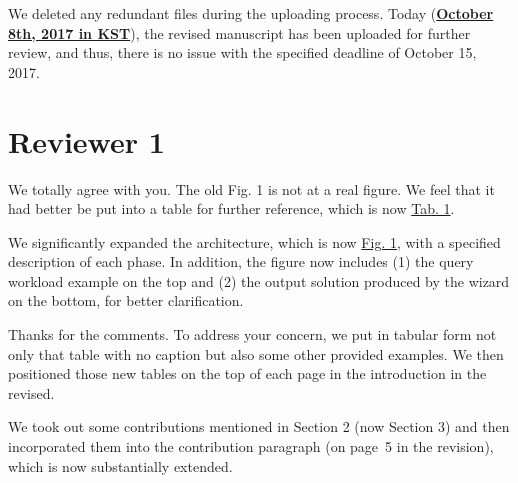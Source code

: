 \documentclass[10pt,letterpaper]{article}
\newenvironment{myindentpar}[1]%
{\begin{list}{}
         {\vspace{10pt}
					\setlength{\leftmargin}{#1}}
          \item[]
}
{\end{list}}
\newcommand{\rev}[1]{\begin{myindentpar}{.25in} {\em {\color{blue}{#1}}}\end{myindentpar}}
\begin{document}
We deleted any redundant files during the uploading process. Today ({\bf\underline{October 8th, 2017 in KST}}), the revised manuscript has been uploaded for further review, 
and thus, there is no issue with the specified deadline of October 15, 2017.

\clearpage
\section*{Reviewer 1}\label{sec:rev1}

\rev{
[Reviewer(s)' Comments to Author]:
Reviewer: 1

Comments to the Author
Generally Fig1. is not a figure scale and can be considered as a structure rather aha a Fig. 1. technically, the primary figures are the general scale and structure of the method which tends to grasp the authors' attention and must be clarified. 
}

We totally agree with you. The old Fig. 1 is not at a real figure. We feel that it had better be put into a table for further reference, which is now {\color{blue}\underline{Tab. 1}}.

\rev{
The presented Wizard Architecture in Fig. 2 needs to be expanded. 
}

We significantly expanded the architecture, which is now {\color{blue}\underline{Fig. 1}}, with a specified description of each phase. In addition, 
the figure now includes (1) the query workload example on the top and (2) the output solution 
produced by the wizard on the bottom, for better clarification.

\rev{
The table in Page3 does not have any caption to introduces besides, its location is badly organized.
}
Thanks for the comments. To address your concern, we put in tabular form not only that table with no caption but also 
some other provided examples. We then positioned those new tables on the top of each page in the introduction in the revised.

\rev{
The main contribution of the paper is so limited and needs to be extended in Section 1. 
} 

We took out some contributions mentioned in Section 2 (now Section 3) and then incorporated them into the contribution paragraph (on page~5 
in the revision), which is now substantially extended. 

\rev{ 
In the experiment environmental setting, the deployment in realistic datasets are missing and must be indicated for the reproduction of the future readers.  
}
 
\end{document}
